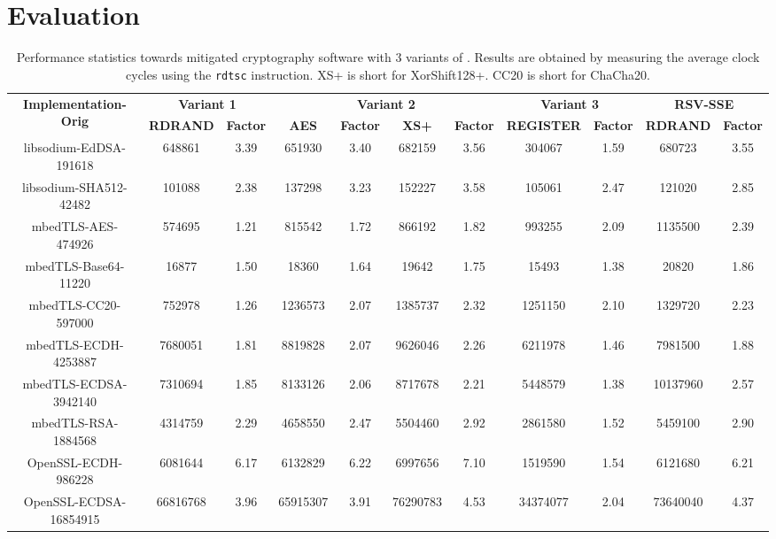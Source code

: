 \section{Evaluation}
\label{sec:evaluation}



\begin{table*}[!htbp]
\centering
\caption{Performance statistics towards mitigated cryptography software with 3 variants of \tool. Results are obtained by measuring the average clock cycles using the \texttt{rdtsc} instruction. XS+ is short for XorShift128+. CC20 is short for ChaCha20.}
\label{tab:resultsoverview}
\footnotesize
\begin{tabular}{c|cc|cccc|cc|cc}
\hline
    \multirow{2}{*}{\textbf{Implementation-Orig}}
    &\multicolumn{2}{c|}{\textbf{Variant 1}}
    &\multicolumn{4}{c|}{\textbf{Variant 2}}
    &\multicolumn{2}{c|}{\textbf{Variant 3}}
    &\multicolumn{2}{c}{\textbf{RSV-SSE}}\\
    & \textbf{RDRAND} & \textbf{Factor}
    & \textbf{AES} & \textbf{Factor} & \textbf{XS+} & \textbf{Factor}
    & \textbf{REGISTER} & \textbf{Factor}
    & \textbf{RDRAND} & \textbf{Factor}\\
\hline
    libsodium-EdDSA-191618	&648861	&3.39 &	651930	&3.40 	&682159	&3.56 &	304067	&1.59 & 680723 & 3.55\\
    libsodium-SHA512-42482	&101088	&2.38 &	137298	&3.23 	&152227	&3.58 &	105061	&2.47 & 121020 & 2.85\\
\hline
    mbedTLS-AES-474926	&574695	&1.21 &	815542	&1.72 	&866192	&1.82 &	993255	&2.09 & 1135500 & 2.39\\
    mbedTLS-Base64-11220	&16877	&1.50 &	18360	&1.64 	&19642	&1.75 &	15493	&1.38 & 20820 & 1.86\\
    mbedTLS-CC20-597000	&752978	&1.26 &	1236573	&2.07 	&1385737	&2.32 &	1251150	&2.10 & 1329720 & 2.23\\
    mbedTLS-ECDH-4253887	&7680051	&1.81 &	8819828	&2.07 	&9626046	&2.26 &	6211978	&1.46 & 7981500 & 1.88\\
    mbedTLS-ECDSA-3942140	&7310694	&1.85 &	8133126	&2.06 	&8717678	&2.21 &	5448579	&1.38 & 10137960 & 2.57\\
    mbedTLS-RSA-1884568	&4314759	&2.29 &	4658550	&2.47 	&5504460	&2.92 &	2861580	&1.52 & 5459100 & 2.90\\
\hline
    OpenSSL-ECDH-986228	&6081644	&6.17 &	6132829	&6.22 	&6997656	&7.10 &	1519590	&1.54 & 6121680 & 6.21\\
    OpenSSL-ECDSA-16854915	&66816768	&3.96 &	65915307	&3.91 	&76290783	&4.53 &	34374077	&2.04 & 73640040 & 4.37\\

\end{tabular}
\end{table*}
